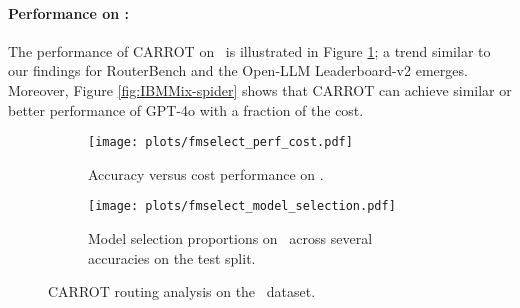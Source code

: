 \paragraph{Performance on \newdata:} The performance of CARROT on \newdata\ is illustrated in Figure \ref{fig:ROOT In Distribution}; a trend similar to our findings for RouterBench and the Open-LLM Leaderboard-v2 emerges. Moreover, Figure \ref{fig:IBMMix-spider} shows that CARROT can achieve similar or better performance of {GPT-4o} with a fraction of the cost. 



\begin{figure}[ht]
       \centering
       \begin{subfigure}[b]{0.5\textwidth}
           \centering
           \texttt{[image: plots/fmselect\_perf\_cost.pdf]}
           \caption{Accuracy versus cost performance on \newdata.}
           \label{fig:ROOT In Distribution}
       \end{subfigure}
       \hspace{0.05\textwidth} %
       \begin{subfigure}[b]{0.4\textwidth}
           \centering
           \texttt{[image: plots/fmselect\_model\_selection.pdf]}
    \caption{Model selection proportions on \newdata\ across several accuracies on the test split.}
           \label{fig:model selection}
       \end{subfigure}
       \caption{CARROT routing analysis on the \newdata\ dataset.}
       \label{fig:fmselect}
   \end{figure}


